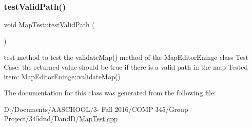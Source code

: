\subsubsection{\texorpdfstring{test\+Valid\+Path()}{testValidPath()}}
{\footnotesize\ttfamily void Map\+Test\+::test\+Valid\+Path (\begin{DoxyParamCaption}{ }\end{DoxyParamCaption})\hspace{0.3cm}{\ttfamily [protected]}}

test method to test the validate\+Map() method of the Map\+Editor\+Eninge class Test Case\+: the returned value should be true if there is a valid path in the map Tested item\+: Map\+Editor\+Eninge\+::validate\+Map() 

The documentation for this class was generated from the following file\+:\begin{DoxyCompactItemize}
\item 
D\+:/\+Documents/\+A\+A\+S\+C\+H\+O\+O\+L/3-\/ Fall 2016/\+C\+O\+M\+P 345/\+Group Project/345dnd/\+Dand\+D/\hyperlink{_map_test_8cpp}{Map\+Test.\+cpp}\end{DoxyCompactItemize}
